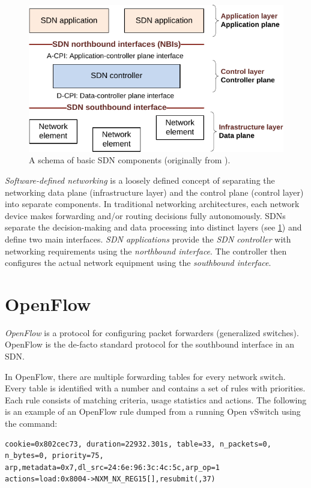 \begin{figure}
    \centering
    \includegraphics[width=.6\linewidth]{img/sdn_basic_schema.pdf}
    \caption{A schema of basic SDN components (originally from \cite{SdnArch}).}
    \label{fig:sdn-schema}
\end{figure}

\emph{Software-defined networking} is a loosely defined concept of separating the networking data plane (infrastructure layer) and the control plane (control layer) into separate components. In traditional networking architectures, each network device makes forwarding and/or routing decisions fully autonomously. SDNs separate the decision-making and data processing into distinct layers (see \cref{fig:sdn-schema}) and define two main interfaces. \emph{SDN applications} provide the \emph{SDN controller} with networking requirements using the \emph{northbound interface}. The controller then configures the actual network equipment using the \emph{southbound interface}.

\section{OpenFlow}
\label{sec:openflow}

\emph{OpenFlow} \cite{OFSpec} is a protocol for configuring packet forwarders (generalized switches). OpenFlow is the de-facto standard protocol for the southbound interface in an SDN.

In OpenFlow, there are multiple forwarding tables for every network switch. Every table is identified with a number and contains a set of rules with priorities. Each rule consists of matching criteria, usage statistics and actions. The following is an example of an OpenFlow rule dumped from a running Open vSwitch using the  command:

\begin{verbatim}
cookie=0x802cec73, duration=22932.301s, table=33, n_packets=0,
n_bytes=0, priority=75,
arp,metadata=0x7,dl_src=24:6e:96:3c:4c:5c,arp_op=1
actions=load:0x8004->NXM_NX_REG15[],resubmit(,37)
\end{verbatim}

